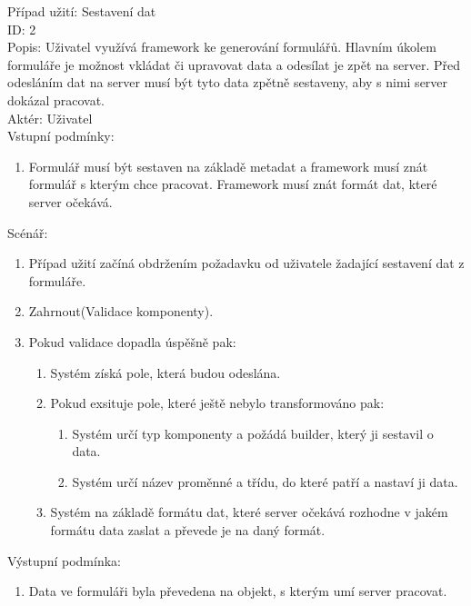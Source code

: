 Případ užití: Sestavení dat\\
ID: 2\\
Popis: 
Uživatel využívá framework ke generování formulářů. Hlavním úkolem formuláře je možnost vkládat či upravovat data a odesílat je zpět na server. Před odesláním dat na server musí být tyto data zpětně sestaveny, aby s nimi server dokázal pracovat.
\\
Aktér: Uživatel\\
Vstupní podmínky:
\begin{enumerate}
\item Formulář musí být sestaven na základě metadat a framework musí znát formulář s kterým chce pracovat. Framework musí znát formát dat, které server očekává.
\end{enumerate}
Scénář:
\begin{enumerate}
\item Případ užití začíná obdržením požadavku od uživatele žadající sestavení dat z formuláře.
\item Zahrnout(Validace komponenty).
\item Pokud validace dopadla úspěšně pak:
\begin{enumerate}
\item Systém získá pole, která budou odeslána.
\item Pokud exsituje pole, které ještě nebylo transformováno pak:
\begin{enumerate}
\item Systém určí typ komponenty a požádá builder, který ji sestavil o data.
\item Systém určí název proměnné a třídu, do které patří a nastaví ji data.
\end {enumerate}
\item Systém na základě formátu dat, které server očekává rozhodne v jakém formátu data zaslat a převede je na daný formát.
\end{enumerate}
\end{enumerate}

Výstupní podmínka:
\begin{enumerate}
\item Data ve formuláři byla převedena na objekt, s kterým umí server pracovat.
\end{enumerate}

